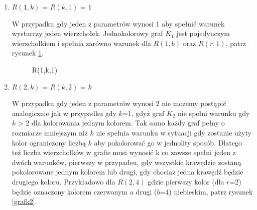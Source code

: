 \begin{enumerate}  

  \item $R(1,k)$ = $R(k,1)$ = 1 \hfill \par
  W przypadku gdy jeden z parametrów wynosi 1 aby spełnić warunek wystarczy jeden wierzchołek.  Jednokolorowy graf $\mathit{K}_{1}$ jest pojedynczym wierzchołkiem i spełnia zarówno warunek dla $R(1,b)$ oraz $R(r,1)$, patrz rysunek \ref{grafk1}. 
  
  \begin{figure}[h]
  \centering
   \caption{R(1,k,1)}
   \label{grafk1}
\end{figure}
  
   \item $R(2,k)$ = $R(k,2)$ = $k$ \hfill \par
	W przypadku gdy jeden z parametrów wynosi 2 nie możemy postąpić analogicznie jak w przypadku gdy $k$=1, gdyż graf $\mathit{K}_{2}$ nie spełni warunku gdy $k$ > 2 dla kolorowania jednym kolorem. Tak samo każdy graf pełny o rozmiarze mniejszym niż $k$ nie spełnia warunku w sytuacji gdy zostanie użyty kolor ograniczony liczbą $k$ aby pokolorować go w jednolity sposób. Dlatego też liczba wierzchołków w grafie musi wynosić k co zawsze spełni jeden z dwóch warunków, pierwszy w przypadeu, gdy wszystkie krawędzie zostaną pokolorowane jednym kolorem lub drugi, gdy chociaż jedna krawędź będzie drugiego koloru. Przykładowo dla $R(2,4)$ gdzie pierwszy kolor (dla $r$=2) będzie oznaczony kolorem czerwonym a drugi ($b$=4) niebieskim, patrz rysunek \ref{grafk2}.
	
\begin{figure}[H]
  \centering
        \hspace{15mm}
\end{figure}
\end{enumerate}
